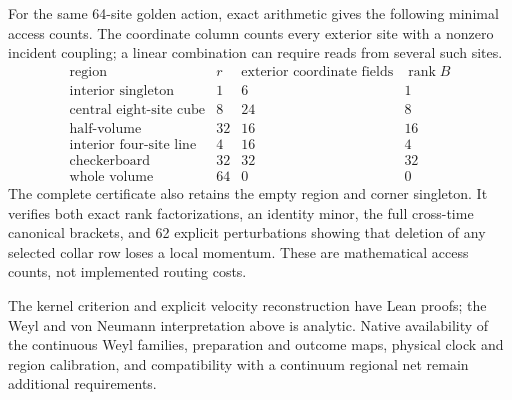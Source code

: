 For the same 64-site golden action, exact arithmetic gives the following
minimal access counts. The coordinate column counts every exterior site
with a nonzero incident coupling; a linear combination can require reads
from several such sites.
\[
\begin{array}{lrrr}
\text{region}&r&\text{exterior coordinate fields}&\operatorname{rank}B\\
\hline
\text{interior singleton}&1&6&1\\
\text{central eight-site cube}&8&24&8\\
\text{half-volume}&32&16&16\\
\text{interior four-site line}&4&16&4\\
\text{checkerboard}&32&32&32\\
\text{whole volume}&64&0&0
\end{array}
\]
The complete certificate also retains the empty region and corner
singleton. It verifies both exact rank factorizations, an identity minor,
the full cross-time canonical brackets, and 62 explicit perturbations
showing that deletion of any selected collar row loses a local momentum.
These are mathematical access counts, not implemented routing costs.

The kernel criterion and explicit velocity reconstruction have Lean
proofs; the Weyl and von Neumann interpretation above is analytic.
Native availability of the continuous Weyl families, preparation and
outcome maps, physical clock and region calibration, and compatibility
with a continuum regional net remain additional requirements.
